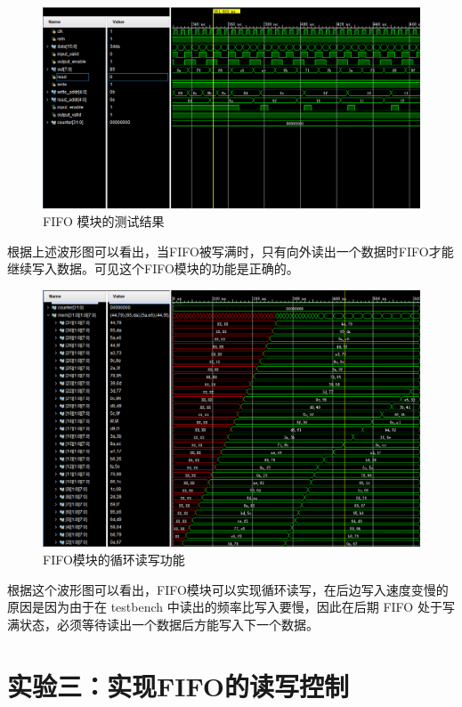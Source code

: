 \documentclass[zihao=5, UTF8]{article}
\theoremstyle{MyLineTheoremStyle} %
\theoremstyle{MyBlockTheoremStyle} %
\theoremstyle{MySubsubsectionStyle} %
\begin{document}
\begin{figure}[H]
    \centering
    \includegraphics[width=\textwidth]{./exp_2_1_fifo.png} %
    \caption{FIFO 模块的测试结果}
    \label{fig:fifo模块的测试结果}
\end{figure}

根据上述波形图可以看出，当FIFO被写满时，只有向外读出一个数据时FIFO才能继续写入数据。可见这个FIFO模块的功能是正确的。

\begin{figure}[H]
    \centering
    \includegraphics[width=\textwidth]{./cyclic_io.png} %
    \caption{FIFO模块的循环读写功能}
    \label{fig:fifo模块的循环读写功能}
\end{figure}

根据这个波形图可以看出，FIFO模块可以实现循环读写，在后边写入速度变慢的原因是因为由于在 testbench 中读出的频率比写入要慢，因此在后期 FIFO 处于写满状态，必须等待读出一个数据后方能写入下一个数据。

\section{实验三：实现FIFO的读写控制}
\end{document}
